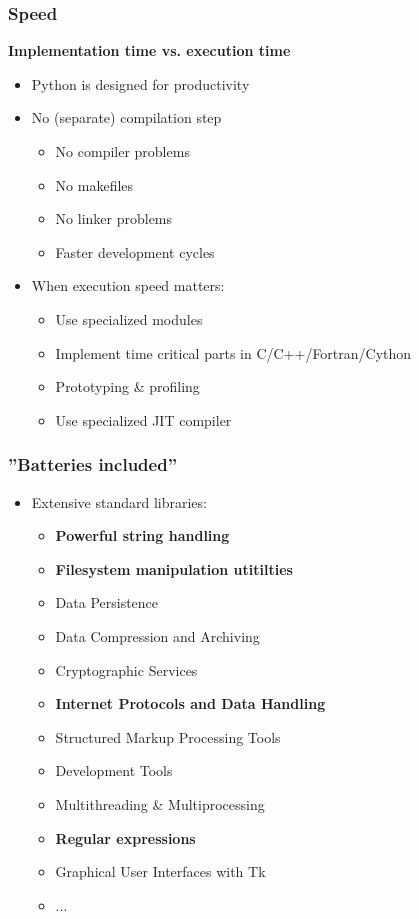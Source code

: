 \documentclass[handout]{beamer}
\begin{document}
\begin{frame}
    \frametitle{Speed}
    \textbf{Implementation time vs. execution time}
    \pause
     \begin{itemize}
    	\item Python is designed for productivity
    	\pause
    	\item No (separate) compilation step
        \begin{itemize}
	    \item No compiler problems
	    \item No makefiles
	    \item No linker problems
	    \item Faster development cycles
        \end{itemize}	    
    	\pause
    	\item When execution speed matters:
        \begin{itemize}
    	    \item Use specialized modules
    	    \item Implement time critical parts in C/C++/Fortran/Cython
      	    \item Prototyping \& profiling
      	    \item Use specialized JIT compiler
        \end{itemize}
    \end{itemize}
\end{frame}

\begin{frame}
    \frametitle{''Batteries included''}
    \begin{itemize}
        \item Extensive standard libraries:
        \begin{itemize}
            \item \textbf{Powerful string handling}
            \item \textbf{Filesystem manipulation utitilties}
            \item Data Persistence
            \item Data Compression and Archiving
            \item Cryptographic Services
            \item \textbf{Internet Protocols and Data Handling}
            \item Structured Markup Processing Tools
            \item Development Tools
            \item Multithreading \& Multiprocessing
            \item \textbf{Regular expressions}
            \item Graphical User Interfaces with Tk
            \item ...
        \end{itemize}
    \end{itemize}
\end{frame}
\end{document}
